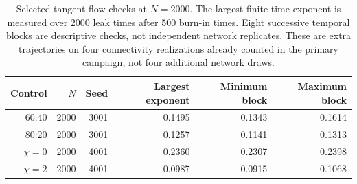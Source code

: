 \begin{table}[htp]
\centering
\small
\caption{Selected tangent-flow checks at $N=2000$. The largest finite-time
exponent is measured over 2000 leak times after 500 burn-in times. Eight
successive temporal blocks are descriptive checks, not independent network
replicates. These are extra trajectories on four connectivity realizations
already counted in the primary campaign, not four additional network draws.}
\label{tab:tangent_checks}
\begin{tabular}{rrrrrr}
\toprule
Control&$N$&Seed&Largest exponent&Minimum block&Maximum block\\
\midrule
60:40&2000&3001&0.1495&0.1343&0.1614\\
80:20&2000&3001&0.1257&0.1141&0.1313\\
$\chi=0$&2000&4001&0.2360&0.2307&0.2398\\
$\chi=2$&2000&4001&0.0987&0.0915&0.1068\\
\bottomrule
\end{tabular}
\end{table}
